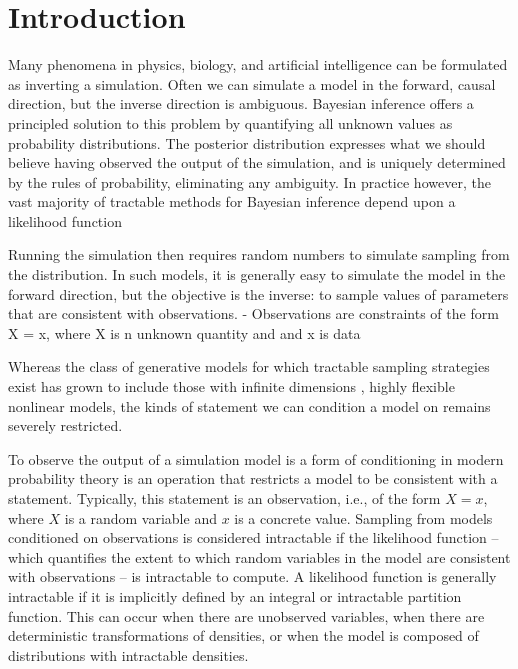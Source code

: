 \section{Introduction}

Many phenomena in physics, biology, and artificial intelligence can be formulated as inverting a simulation.
Often we can simulate a model in the forward, causal direction, but the inverse direction is ambiguous.
Bayesian inference offers a principled solution to this problem 
by quantifying all unknown values as probability distributions.
The posterior distribution expresses what we should believe having observed the output of the simulation, and is uniquely determined by the rules of probability, eliminating any ambiguity.
In practice however, the vast majority of tractable methods for Bayesian inference depend upon a likelihood function

Running the simulation then requires random numbers to simulate sampling from the distribution.
In such models, it is generally easy to simulate the model in the forward direction, but the objective is the inverse: to sample values of parameters that are consistent with observations.
- Observations are constraints of the form X = x, where X is n unknown quantity and and x is data



Whereas the class of generative models for which tractable sampling strategies exist has grown to include those with infinite dimensions \cite{}, highly flexible nonlinear models, the kinds of statement we can condition a model on remains severely restricted.

To observe the output of a simulation model is a form of conditioning in modern probability theory is an operation that restricts a model to be consistent with a statement.
Typically, this statement is an observation, i.e., of the form $X = x$, where $X$ is a random variable and $x$ is a concrete value.
Sampling from models conditioned on observations is considered intractable if the likelihood function --  which quantifies the extent to which random variables in the model are consistent with observations -- is intractable to compute.
A likelihood function is generally intractable if it is implicitly defined by an integral or intractable partition function.
This can occur when there are unobserved variables, when there are deterministic transformations of densities, or when the model is composed of distributions with intractable densities.

